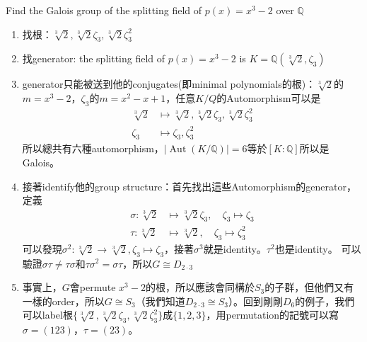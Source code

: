 \documentclass[12pt]{article}
\theoremstyle{definition}
\newcommand{\QQ}{\mathbb Q}
\DeclareMathOperator{\Aut}{Aut}
\begin{document}
\begin{ex}
	Find the Galois group of the splitting field of $p(x)=x^3-2$ over $\QQ$

	\begin{enumerate}
		\item 找根：$\sqrt[3]{2},\sqrt[3]{2}\zeta_3,\sqrt[3]{2}\zeta_3^2$
		\item 找generator: the splitting field of $p(x)=x^3-2$ is $K=\QQ(\sqrt[3]{2},\zeta_3)$
		\item generator只能被送到他的conjugates(即minimal polynomials的根)：$\sqrt[3]{2}$的$m=x^3-2$，$\zeta_3$的$m=x^2-x+1$，任意$K/Q$的Automorphism可以是
		      \begin{align*}
			      \sqrt[3]{2} & \mapsto \sqrt[3]{2}, \sqrt[3]{2}\zeta_3, \sqrt[3]{2}\zeta_3^2 \\
			      \zeta_3     & \mapsto \zeta_3, \zeta_3^2
		      \end{align*}
		      所以總共有六種automorphism，$|\Aut(K/\QQ)|=6$等於$[K:\QQ]$所以是Galois。
		\item 接著identify他的group structure：首先找出這些Automorphism的generator，定義
		      \begin{align*}
			      \sigma: \sqrt[3]{2} & \mapsto \sqrt[3]{2}\zeta_3,\quad\zeta_3 \mapsto \zeta_3 \\
			      \tau: \sqrt[3]{2}   & \mapsto \sqrt[3]{2},\quad \zeta_3\mapsto \zeta_3^2
		      \end{align*}
		      可以發現$\sigma^2: \sqrt[3]{2}\to\sqrt[3]{2}, \zeta_3\mapsto \zeta_3$，接著$\sigma^3$就是identity。$\tau^2$也是identity。
		      可以驗證$\sigma\tau\neq\tau\sigma$和$\tau\sigma^2=\sigma\tau$，所以$G\cong D_{2\cdot 3}$
		\item 事實上，$G$會permute $x^3-2$的根，所以應該會同構於$S_3$的子群，但他們又有一樣的order，所以$G\cong S_3$（我們知道$D_{2\cdot 3}\cong S_3$）。回到剛剛$D_6$的例子，我們可以label根$\{\sqrt[3]{2},\sqrt[3]{2}\zeta_3,\sqrt[3]{2}\zeta_3^2\}$成$\{1,2,3\}$，用permutation的記號可以寫$\sigma=(123)$，$\tau=(23)$。
	\end{enumerate}
\end{ex}
\end{document}
